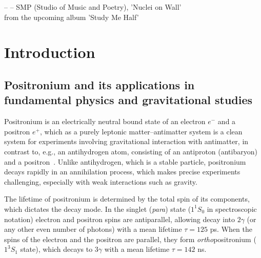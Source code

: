 \documentclass[12pt]{report}
\begin{document}
\vspace{1cm}

\begin{flushright}
-- -- SMP (Studio of Music and Poetry), 'Nuclei on Wall'\\
{\footnotesize from the upcoming album 'Study Me Half'}
\end{flushright}

\restoregeometry
\setcounter{page}{6}
\clearpage
\tableofcontents

\clearpage

\clearpage
\listoffigures 

\clearpage
\listoftables  

\edef\marginnotetextwidth{\the\textwidth}



\chapter{Introduction}

\section{Positronium and its applications in fundamental physics and gravitational studies}

Positronium is an electrically neutral bound state of an electron $e^-$ and a positron $e^+$, which as a purely leptonic matter--antimatter system is a clean system for experiments involving gravitational interaction with antimatter, in contrast to, e.g., an antihydrogen atom, consisting of an antiproton (antibaryon) and a positron~\cite{Bass_Mariazzi_Moskal_Stepien_2023}. Unlike antihydrogen, which is a stable particle, positronium decays rapidly in an annihilation process, which makes  precise experiments challenging, especially with weak interactions such as gravity. 

The lifetime of positronium is determined by the total spin of its components, which dictates the decay mode.
In the singlet (\emph{para}) state ($1^1S_0$ in spectroscopic notation) electron and positron spins are antiparallel, allowing decay into $2\gamma$ (or any other even number of photons) with a mean lifetime $\tau=125$ ps. When the spins of the electron and the positron are parallel, they form \emph{ortho}positronium ($1^3S_1$ state), which decays to $3\gamma$ with a mean lifetime $\tau=142$ ns.
\end{document}
